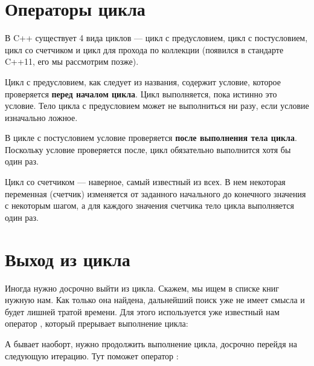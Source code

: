 \documentclass[book.tex]{subfiles}
\begin{document}

\section*{Операторы цикла}


В C++ существует 4 вида циклов --- цикл с предусловием, цикл с постусловием, цикл со счетчиком и цикл для прохода по коллекции (появился в стандарте C++11, его мы рассмотрим позже).

Цикл с предусловием, как следует из названия, содержит условие, которое проверяется \textbf{перед началом цикла}. Цикл выполняется, пока истинно это условие. Тело цикла с предусловием может не выполниться ни разу, если условие изначально ложное.

В цикле с постусловием условие проверяется \textbf{после выполнения тела цикла}. Поскольку условие проверяется после, цикл обязательно выполнится хотя бы один раз.

Цикл со счетчиком --- наверное, самый известный из всех. В нем некоторая переменная (счетчик) изменяется от заданного начального до конечного значения с некоторым шагом, а для каждого значения счетчика тело цикла выполняется один раз.


\section*{Выход из цикла}

Иногда нужно досрочно выйти из цикла. Скажем, мы ищем в списке книг нужную нам. Как только она найдена, дальнейший поиск уже не имеет смысла и будет лишней тратой времени. Для этого используется уже известный нам оператор , который прерывает выполнение цикла:


А бывает наоборт, нужно продолжить выполнение цикла, досрочно перейдя на следующую итерацию. Тут поможет оператор :
\end{document}
